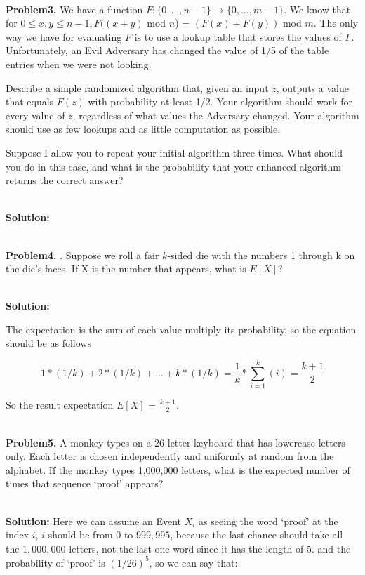\documentclass{article}
\begin{document}
~\\

\noindent \textbf{Problem3.} We have a function $F: \{0,...,n-1\} \rightarrow \{0,...,m-1\}$. We know that, for $0 \le x, y \le n - 1, F((x +y)$ mod $n$) = $(F(x) + F(y))$ mod $m$. The only way we have for evaluating $F$ is to use a lookup table that
stores the values of $F$. Unfortunately, an Evil Adversary has changed the value of 1/5 of the table entries
when we were not looking.

Describe a simple randomized algorithm that, given an input $z$, outputs a value that equals $F(z)$ with
probability at least 1/2. Your algorithm should work for every value of $z$, regardless of what values the
Adversary changed. Your algorithm should use as few lookups and as little computation as possible.


Suppose I allow you to repeat your initial algorithm three times. What should you do in this case, and
what is the probability that your enhanced algorithm returns the correct answer?

~\\

\noindent \textbf{Solution:}

~\\

\noindent \textbf{Problem4.} . Suppose we roll a fair $k$-sided die with the numbers 1 through k on the die's faces. If X is the number that appears, what is $E[X]$?

~\\

\noindent \textbf{Solution:}

The expectation is the sum of each value multiply its probability, so the equation should be as follows

$$ 1 * (1/k) + 2 * (1/k) + ... + k * (1/k) = \frac{1}{k} * \sum_{i=1}^{k}(i) = \frac{k+1}{2}$$

So the result expectation $E[X]$ = $\frac{k+1}{2}$.

~\\

\noindent \textbf{Problem5.} A monkey types on a 26-letter keyboard that has lowercase letters only. Each letter is chosen independently and uniformly at random from the alphabet. If the monkey types 1,000,000 letters, what is
the expected number of times that sequence `proof' appears?

~\\

\noindent \textbf{Solution:}
Here we can assume an Event $X_i$ as seeing the word `proof' at the index $i$, $i$ should be from 0 to $999,995$, because the last chance should take all the $1,000,000$ letters, not the last one word since it has the length of 5.
and the probability of `proof' is $(1/26)^5$, so we can say that:
\end{document}
